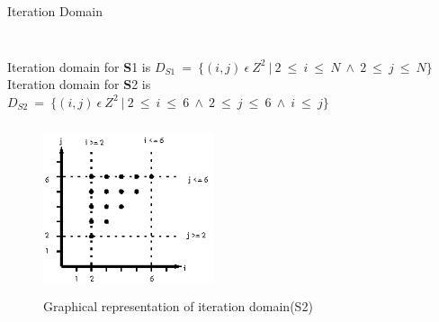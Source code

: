 \documentclass{beamer}
\begin{document}
\begin{frame}[shrink]{Iteration Domain}
\begin{columns}[t]
	\begin{block}{ }
	{\tiny}
	\end{block}
	
	\begin{block}{ }
	{\tiny}
	\end{block}
	\end{columns}
\pause
Iteration domain for {\textbf S1} is 
$D_{S1}\ =\ \{(i,j)\ \epsilon\ Z^2\ |\ 2\ \leq\ i\ \leq\ N\ \wedge\ 2\ \leq\ j\ \leq\ N\}$
\linebreak\linebreak
Iteration domain for {\textbf S2} is 
$D_{S2}\ =\ \{(i,j)\ \epsilon\ Z^2\ |\ 2\ \leq\ i\ \leq\ 6\ \wedge\ 2\ \leq\ j\ \leq\ 6\ \wedge\ i\ \leq\ j\}$
\pause
\begin{figure}
\begin{center}
  \includegraphics[height=5cm,width=5cm]{images/iter1.eps}
  \caption{Graphical representation of iteration domain(S2)}
  \label{fig:iter1}
\end{center}  
\end{figure}
\end{frame}
\end{document}
